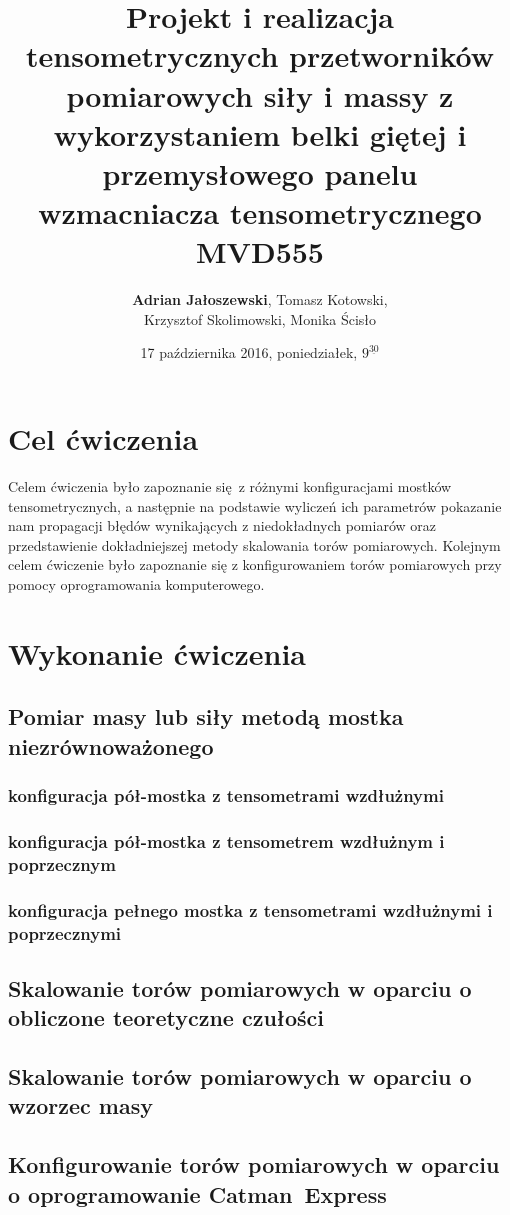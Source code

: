 \documentclass[a4paper, 12pt, titlepage]{article}
\title{Projekt i realizacja tensometrycznych przetworników pomiarowych siły i massy z wykorzystaniem belki giętej i przemysłowego panelu wzmacniacza tensometrycznego MVD555}
\author{\textbf{Adrian Jałoszewski}, Tomasz Kotowski,\\Krzysztof Skolimowski, Monika Ścisło}
\date{17 października 2016, poniedziałek, $9^{\underline{30}}$}
\begin{document}
	\maketitle
	\tableofcontents
	\newpage
	\section{Cel ćwiczenia}
		Celem ćwiczenia było zapoznanie się z różnymi konfiguracjami mostków tensometrycznych, a następnie na podstawie wyliczeń ich parametrów pokazanie nam propagacji błędów wynikających z niedokładnych pomiarów oraz przedstawienie dokładniejszej metody skalowania torów pomiarowych. Kolejnym celem ćwiczenie było zapoznanie się z konfigurowaniem torów pomiarowych przy pomocy oprogramowania komputerowego.
	\section{Wykonanie ćwiczenia}
		\subsection{Pomiar masy lub siły metodą mostka niezrównoważonego}
			\subsubsection{konfiguracja pół-mostka z tensometrami wzdłużnymi}
			\subsubsection{konfiguracja pół-mostka z tensometrem wzdłużnym i poprzecznym}
			\subsubsection{konfiguracja pełnego mostka z tensometrami wzdłużnymi i poprzecznymi}
		\subsection{Skalowanie torów pomiarowych w oparciu o obliczone teoretyczne czułości}
		\subsection{Skalowanie torów pomiarowych w oparciu o wzorzec masy}
		\subsection{Konfigurowanie torów pomiarowych w oparciu o oprogramowanie Catman\textregistered\ Express}
\end{document}
